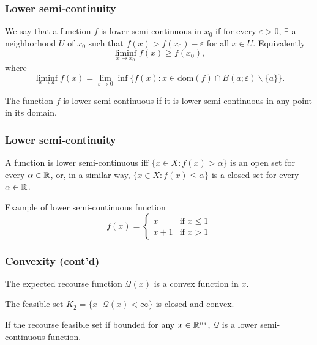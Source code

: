 \documentclass[french]{beamer}
\begin{document}
\begin{frame}
\frametitle{Lower semi-continuity}

We say that a function $f$ is {\blue lower semi-continuous in $x_0$} if for every $\varepsilon > 0$, $\exists$ a neighborhood $U$ of $x_0$ such that $f(x) > f(x_0) - \varepsilon$ for all $x \in U$.
Equivalently
\[
\liminf_{x \to x_{0}} f(x) \geq f(x_{0}),
\]
where
\[
\liminf_{x \to a} f(x) = \lim_{\varepsilon \to 0} \inf \{ f(x) : x
\in \mbox{dom}(f) \cap B(a;\varepsilon) \backslash \{a\} \}.
\]

\mbox{}

The function $f$ is {\blue lower semi-continuous} if it is lower semi-continuous in any point in its domain.

\end{frame}

\begin{frame}
\frametitle{Lower semi-continuity}


A function is lower semi-continuous iff $\lbrace x\in X : f(x) > \alpha \rbrace$ is an open set for every  $\alpha \in {\mathbb{R}}$, or, in a similar way, $\lbrace x\in X : f(x) \leq \alpha \rbrace$ is a closed set for every $\alpha \in {\mathbb{R}}$.

\mbox{}

Example of lower semi-continuous function
$$
f(x) =
\begin{cases}
x & \text{if } x \leq 1 \\
x + 1 & \text{if } x > 1
\end{cases}
$$

\end{frame}

\begin{frame}
\frametitle{Convexity (cont'd)}

\begin{corollary}
The expected recourse function $\mathcal{Q}(x)$ is a convex function in $x$.
\end{corollary}

\begin{corollary}
The feasible set $K_2 = \lbrace x \,|\, \mathcal{Q}(x) < \infty \rbrace$ is closed and convex.
\end{corollary}

\begin{corollary}
If the recourse feasible set if bounded for any $x \in {\mathbb{R}}^{n_1}$, $\mathcal{Q}$ is a lower semi-continuous function.
\end{corollary}

\end{frame}
\end{document}
